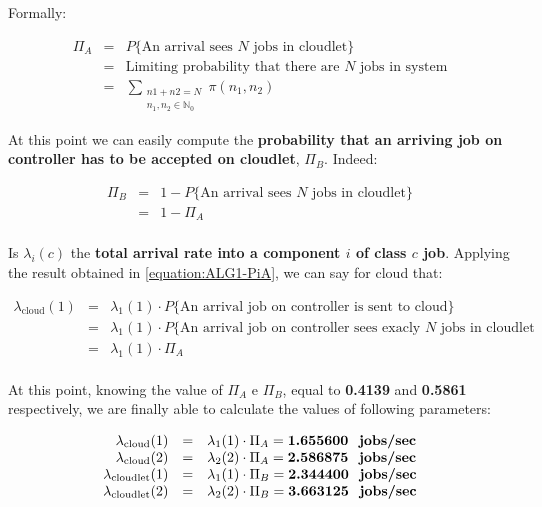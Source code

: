 \documentclass[10pt,a4paper]{article}
\begin{document}
Formally:

\begin{equation}\label{equation:ALG1-PiA}
\begin{array} {lcl} 
\Pi_A & = & P\lbrace{\text{An arrival sees $N$ jobs in cloudlet}}\rbrace \\
& = & \text{Limiting probability that there are $N$ jobs in system} \\
& = & \displaystyle \sum_{\substack{ n1+n2=N \\ n_1, n_2 \in \mathbb{N}_0}} \pi(n_1,n_2)
\end{array}
\end{equation}

At this point we can easily compute the \textbf{probability that an arriving job on controller has to be accepted on cloudlet}, \textbf{$\Pi_B$}. Indeed:

\begin{equation}\label{equation:ALG1-PiB}
\begin{array} {lcl} 
\Pi_B & = & 1 - P\lbrace{\text{An arrival sees $N$ jobs in cloudlet}}\rbrace \\
& = & 1 - \Pi_A \\
\end{array}
\end{equation}

Is $\lambda_i(c)$ the \textbf{total arrival rate into a component $i$ of class $c$ job}. Applying the result obtained in \ref{equation:ALG1-PiA}, we can say for cloud that: 

\begin{equation}
\begin{array} {lcl} 
\lambda_{\text{cloud}}(1) & = & \lambda_1(1)\cdot P\lbrace\text{An arrival job on controller is sent to cloud}\rbrace \\
& = & \lambda_1(1)\cdot P\lbrace{\text{An arrival job on controller sees exacly $N$ jobs in cloudlet}} \\
& = & \lambda_1(1)\cdot \Pi_A \\
\end{array}
\end{equation}

At this point, knowing the value of $\Pi_A$ e $\Pi_B$, equal to \textbf{0.4139} and \textbf{0.5861} respectively, we are finally able to calculate the values of following parameters:

\begin{equation}
\begin{array} {rcl}

\lambda_{\text{cloud}}(1) & = & \lambda_1(1)\cdot \Pi_A = \textbf{1.655600 \text{ jobs/sec}} \\
\lambda_{\text{cloud}}(2) & = & \lambda_2(2)\cdot \Pi_A = \textbf{2.586875 \text{ jobs/sec}} \\

\lambda_{\text{cloudlet}}(1) & = & \lambda_1(1)\cdot \Pi_B = \textbf{2.344400 \text{ jobs/sec}} \\
\lambda_{\text{cloudlet}}(2) & = & \lambda_2(2)\cdot \Pi_B = \textbf{3.663125 \text{ jobs/sec}} \\
\end{array}
\end{equation}
\end{document}

